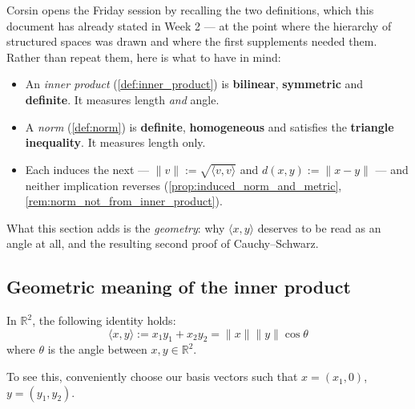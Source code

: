 Corsin opens the Friday session by recalling the two definitions, which this document has
already stated in Week 2 --- at the point where the hierarchy of structured spaces was drawn and
where the first supplements needed them. Rather than repeat them, here is what to have in mind:
\begin{itemize}
  \item An \emph{inner product} (\cref{def:inner_product}) is \textbf{bilinear},
    \textbf{symmetric} and \textbf{definite}. It measures length \emph{and} angle.
  \item A \emph{norm} (\cref{def:norm}) is \textbf{definite}, \textbf{homogeneous} and
    satisfies the \textbf{triangle inequality}. It measures length only.
  \item Each induces the next --- $\|v\| := \sqrt{\langle v,v\rangle}$ and
    $d(x,y) := \|x-y\|$ --- and neither implication reverses
    (\cref{prop:induced_norm_and_metric}, \cref{rem:norm_not_from_inner_product}).
\end{itemize}
What this section adds is the \emph{geometry}: why $\langle x,y\rangle$ deserves to be read as an
angle at all, and the resulting second proof of Cauchy--Schwarz.

\subsection{Geometric meaning of the inner product}

In $\mathbb{R}^2$, the following identity holds:
\[
\langle x,y\rangle := x_1y_1 + x_2y_2 = \|x\|\|y\|\cos\theta
\]
where $\theta$ is the angle between $x, y \in \mathbb{R}^2$.

To see this, conveniently choose our basis vectors such that $x = (x_1, 0)$, $y = (y_1, y_2)$.

